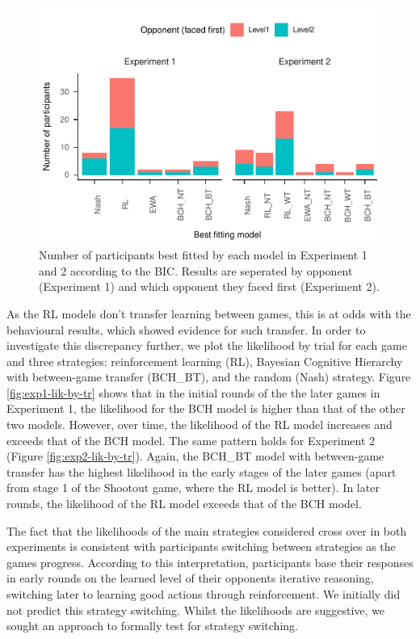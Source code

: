 \documentclass[smallextended]{svjour3}       %
\begin{document}
\begin{figure}

{\centering \includegraphics[width=\textwidth]{CBB_v2_files/figure-latex/exp-comp-models-1} 

}

\caption{Number of participants best fitted by each model  in Experiment 1 and 2 according to the BIC. Results are seperated by opponent (Experiment 1) and which opponent they faced first (Experiment 2).}\label{fig:exp-comp-models}
\end{figure}

As the RL models don't transfer learning between games, this is at odds
with the behavioural results, which showed evidence for such transfer.
In order to investigate this discrepancy further, we plot the likelihood
by trial for each game and three strategies: reinforcement learning
(RL), Bayesian Cognitive Hierarchy with between-game transfer (BCH\_BT),
and the random (Nash) strategy. Figure \ref{fig:exp1-lik-by-tr} shows
that in the initial rounds of the the later games in Experiment 1, the
likelihood for the BCH model is higher than that of the other two
models. However, over time, the likelihood of the RL model increases and
exceeds that of the BCH model. The same pattern holds for Experiment 2
(Figure \ref{fig:exp2-lik-by-tr}). Again, the BCH\_BT model with
between-game transfer has the highest likelihood in the early stages of
the later games (apart from stage 1 of the Shootout game, where the RL
model is better). In later rounds, the likelihood of the RL model
exceeds that of the BCH model.

The fact that the likelihoods of the main strategies considered cross
over in both experiments is consistent with participants switching
between strategies as the games progress. According to this
interpretation, participants base their responses in early rounds on the
learned level of their opponents iterative reasoning, switching later to
learning good actions through reinforcement. We initially did not
predict this strategy switching. Whilst the likelihoods are suggestive,
we sought an approach to formally test for strategy switching.
\end{document}
